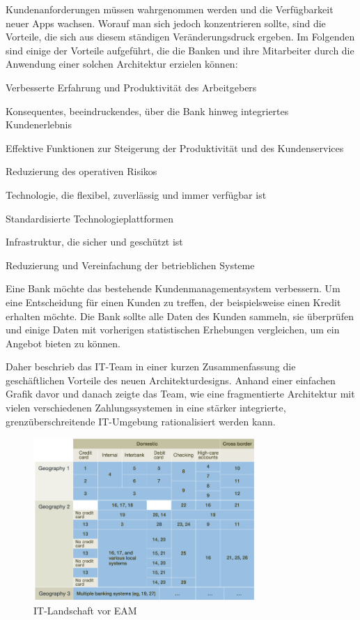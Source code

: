 \documentclass[
	doc,
	a4paper,
	helv
	]{apa6}
\begin{document}
Kundenanforderungen müssen wahrgenommen werden und die Verfügbarkeit neuer Apps wachsen. Worauf man sich jedoch konzentrieren sollte, sind die Vorteile, die sich aus diesem ständigen Veränderungsdruck ergeben. Im Folgenden sind einige der Vorteile aufgeführt, die die Banken und ihre Mitarbeiter durch die Anwendung einer solchen Architektur erzielen können:

\begin{APAitemize}
\item Verbesserte Erfahrung und Produktivität des Arbeitgebers 
\item Konsequentes, beeindruckendes, über die Bank hinweg integriertes Kundenerlebnis
\item Effektive Funktionen zur Steigerung der Produktivität und des Kundenservices
\item Reduzierung des operativen Risikos
\item Technologie, die flexibel, zuverlässig und immer verfügbar ist
\item Standardisierte Technologieplattformen
\item Infrastruktur, die sicher und geschützt ist
\item Reduzierung und Vereinfachung der betrieblichen Systeme
\end{APAitemize}

\mbox{}

Eine Bank möchte das bestehende Kundenmanagementsystem verbessern. Um eine Entscheidung für einen Kunden zu treffen, der beispielsweise einen Kredit erhalten möchte. Die Bank sollte alle Daten des Kunden sammeln, sie überprüfen und einige Daten mit vorherigen statistischen Erhebungen vergleichen, um ein Angebot bieten zu können.

Daher beschrieb das IT-Team in einer kurzen Zusammenfassung die geschäftlichen Vorteile des neuen Architekturdesigns. Anhand einer einfachen Grafik davor und danach zeigte das Team, wie eine fragmentierte Architektur mit vielen verschiedenen Zahlungssystemen in eine stärker integrierte, grenzüberschreitende IT-Umgebung rationalisiert werden kann.

\begin{figure}[!htbp]
\begin{center}
\includegraphics[width=0.75\textwidth]{Abbildungen/McKinsey1.png}
\caption{IT-Landschaft vor EAM \autocite{McKinsey}}
\label{fig:McKinsey1}
\end{center}
\end{figure}
\end{document}
